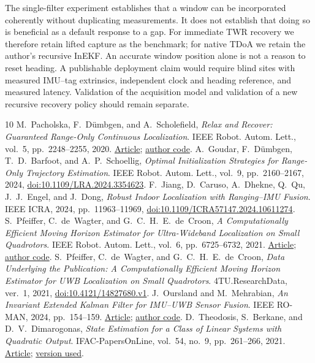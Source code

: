 \documentclass[conference,letterpaper,10pt]{IEEEtran}
\begin{document}
The single-filter experiment establishes that a window can be incorporated coherently without duplicating measurements. It does not establish that doing so is beneficial as a default response to a gap. For immediate TWR recovery we therefore retain lifted capture as the benchmark; for native TDoA we retain the author's recursive InEKF. An accurate window position alone is not a reason to reset heading. A publishable deployment claim would require blind sites with measured IMU--tag extrinsics, independent clock and heading reference, and measured latency. Validation of the acquisition model and validation of a new recursive recovery policy should remain separate.
\balance
\begin{thebibliography}{10}
 M.~Pacholska, F.~D\"umbgen, and A.~Scholefield, \emph{Relax and Recover: Guaranteed Range-Only Continuous Localization}. IEEE Robot. Autom. Lett., vol.~5, pp.~2248--2255, 2020. \href{https://doi.org/10.1109/LRA.2020.2970952}{Article}; \href{https://github.com/LCAV/continuous-localization}{author code}.
 A.~Goudar, F.~D\"umbgen, T.~D.~Barfoot, and A.~P.~Schoellig, \emph{Optimal Initialization Strategies for Range-Only Trajectory Estimation}. IEEE Robot. Autom. Lett., vol.~9, pp.~2160--2167, 2024, \href{https://doi.org/10.1109/LRA.2024.3354623}{doi:10.1109/LRA.2024.3354623}.
 F.~Jiang, D.~Caruso, A.~Dhekne, Q.~Qu, J.~J.~Engel, and J.~Dong, \emph{Robust Indoor Localization with Ranging--IMU Fusion}. IEEE ICRA, 2024, pp.~11963--11969, \href{https://doi.org/10.1109/ICRA57147.2024.10611274}{doi:10.1109/ICRA57147.2024.10611274}.
 S.~Pfeiffer, C.~de~Wagter, and G.~C.~H.~E.~de~Croon, \emph{A Computationally Efficient Moving Horizon Estimator for Ultra-Wideband Localization on Small Quadrotors}. IEEE Robot. Autom. Lett., vol.~6, pp.~6725--6732, 2021. \href{https://doi.org/10.1109/LRA.2021.3095519}{Article}; \href{https://github.com/SUPfeiffer/uwb-simulator}{author code}.
 S.~Pfeiffer, C.~de~Wagter, and G.~C.~H.~E.~de~Croon, \emph{Data Underlying the Publication: A Computationally Efficient Moving Horizon Estimator for UWB Localization on Small Quadrotors}. 4TU.ResearchData, ver.~1, 2021, \href{https://doi.org/10.4121/14827680.v1}{doi:10.4121/14827680.v1}.
 J.~Oursland and M.~Mehrabian, \emph{An Invariant Extended Kalman Filter for IMU--UWB Sensor Fusion}. IEEE RO-MAN, 2024, pp.~154--159. \href{https://doi.org/10.1109/RO-MAN60168.2024.10731434}{Article}; \href{https://github.com/oursland/imu-uwb-inekf}{author code}.
 D.~Theodosis, S.~Berkane, and D.~V.~Dimarogonas, \emph{State Estimation for a Class of Linear Systems with Quadratic Output}. IFAC-PapersOnLine, vol.~54, no.~9, pp.~261--266, 2021. \href{https://doi.org/10.1016/j.ifacol.2021.06.149}{Article}; \href{https://arxiv.org/abs/2006.02688v2}{version used}.

\end{thebibliography}
\end{document}
